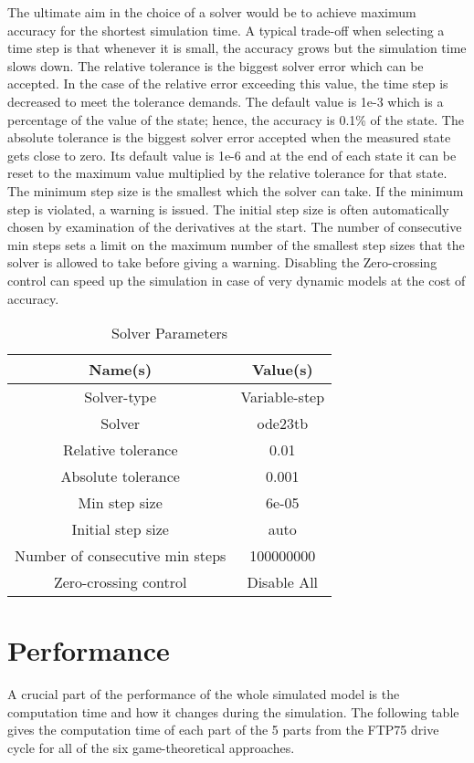 The ultimate aim in the choice of a solver would be to achieve maximum accuracy for the shortest simulation time. A typical trade-off when selecting a time step is that whenever it is small, the accuracy grows but the simulation time slows down. The relative tolerance is the biggest solver error which can be accepted. In the case of the relative error exceeding this value, the time step is decreased to meet the tolerance demands. The default value is 1e-3 which is a percentage of the value of the state; hence, the accuracy is 0.1\% of the state. The absolute tolerance is the biggest solver error accepted when the measured state gets close to zero. Its default value is 1e-6 and at the end of each state it can be reset to the maximum value multiplied by the relative tolerance for that state. The minimum step size is the smallest which the solver can take. If the minimum step is violated, a warning is issued. The initial step size is often automatically chosen by examination of the derivatives at the start. The number of consecutive min steps sets a limit on the maximum number of the smallest step sizes that the solver is allowed to take before giving a warning. Disabling the Zero-crossing control can speed up the simulation in case of very dynamic models at the cost of accuracy.

\begin{table}[h]
\centering
\begin{tabular}{ |c|c| } 
 \hline
 Name(s) & Value(s) \\
 \hline\hline
 Solver-type & Variable-step  \\ 
 Solver & ode23tb \\ 
 Relative tolerance & 0.01 \\ 
 Absolute tolerance & 0.001 \\
 Min step size & 6e-05 \\
 Initial step size & auto \\ 
 Number of consecutive min steps & 100000000 \\
 Zero-crossing control & Disable All \\
 \hline
\end{tabular}
\caption{Solver Parameters}
\label{tab:config}
\end{table}

\section{Performance}
A crucial part of the performance of the whole simulated model is the computation time and how it changes during the simulation. The following table gives the computation time of each part of the 5 parts from the FTP75 drive cycle for all of the six game-theoretical approaches.

